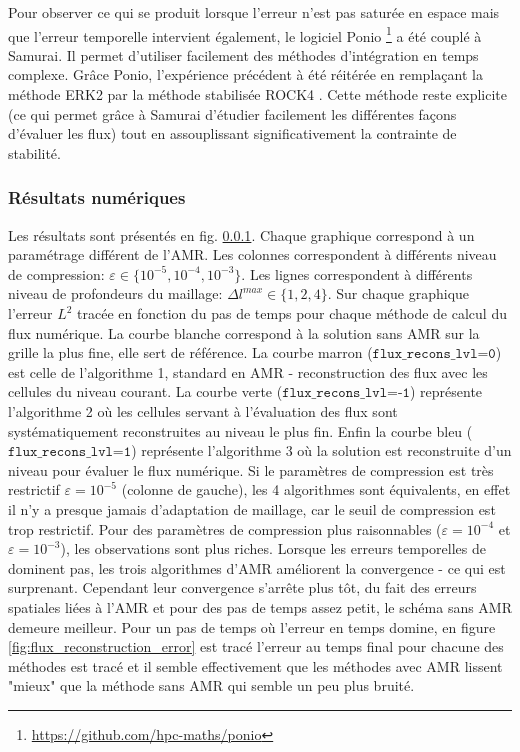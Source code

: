 Pour observer ce qui se produit lorsque l'erreur n'est pas saturée en espace mais que l'erreur temporelle intervient également, 
le logiciel Ponio \footnote{\href{https://github.com/hpc-maths/ponio}{https://github.com/hpc-maths/ponio}} a été couplé à Samurai.
Il permet d'utiliser facilement des méthodes d'intégration en temps complexe. 
Grâce Ponio, l’expérience précédent à été réitérée en remplaçant la méthode ERK2 par la méthode stabilisée ROCK4 \cite{AbdulleMedovikov2001}. 
Cette méthode reste explicite (ce qui permet grâce à Samurai d'étudier facilement les différentes façons d'évaluer les flux) 
tout en assouplissant significativement la contrainte de stabilité.
\subsubsection{Résultats numériques}
    Les résultats sont présentés en fig. \ref{}. Chaque graphique correspond à un paramétrage différent de l'AMR. 
    Les colonnes correspondent à différents niveau de compression: $\varepsilon \in \{10^{-5}, 10^{-4}, 10^{-3}\}$.
    Les lignes correspondent à différents niveau de profondeurs du maillage: $\Delta l^{max} \in \{1,2,4\}$.
    Sur chaque graphique l'erreur $L^2$ tracée en fonction du pas de temps pour chaque méthode de calcul du flux numérique.
    La courbe blanche correspond à la solution sans AMR sur la grille la plus fine, elle sert de référence.
    La courbe marron ($\texttt{flux\_recons\_lvl=0}$) est celle de l'algorithme 1, standard en AMR - reconstruction des flux avec les cellules du niveau courant.
    La courbe verte  ($\texttt{flux\_recons\_lvl=-1}$) représente l’algorithme 2 où les cellules servant à l'évaluation des flux sont systématiquement reconstruites au niveau le plus fin.
    Enfin la courbe bleu ($\texttt{flux\_recons\_lvl=1}$) représente l'algorithme 3 où la solution est reconstruite d'un niveau pour évaluer le flux numérique.
    Si le paramètres de compression est très restrictif $\varepsilon = 10^{-5}$ (colonne de gauche), les 4 algorithmes sont équivalents, en effet il n'y a presque jamais d'adaptation de maillage, car le seuil de compression est trop restrictif.
    Pour des paramètres de compression plus raisonnables ($\varepsilon = 10^{-4}$ et $\varepsilon = 10^{-3}$), les observations sont plus riches.
    Lorsque les erreurs temporelles de dominent pas, les trois algorithmes d'AMR améliorent la convergence - ce qui est surprenant. Cependant leur convergence s'arrête plus tôt, du fait des 
    erreurs spatiales liées à l'AMR et pour des pas de temps assez petit, le schéma sans AMR demeure meilleur. Pour un pas de temps où l'erreur en temps domine, 
    en figure \ref{fig:flux_reconstruction_error} est tracé l'erreur au temps final pour chacune des méthodes est tracé et il semble effectivement que les méthodes avec AMR lissent
    "mieux" que la méthode sans AMR qui semble un peu plus bruité. 

